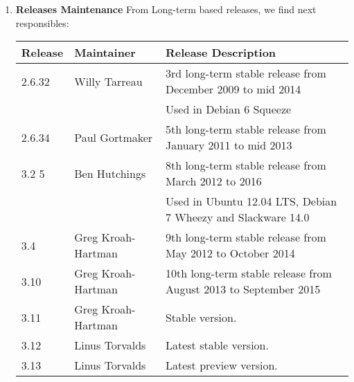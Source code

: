 \documentclass[11pt]{article}
\begin{document}
\begin{enumerate}
\item{\textbf{Releases Maintenance}}
From Long-term based releases, we find next responsibles:\\
\begin{center}
    \hspace*{-2cm}\begin{tabular}{ | l | l | l | }
    \hline
    Release & Maintainer & Release Description\\
    \hline
    \hline
    2.6.32 & Willy Tarreau & 3rd long-term stable release from December 2009 to mid 2014\\
    & & Used in Debian 6 Squeeze\\
    \hline
    2.6.34	& Paul Gortmaker & 5th long-term stable release from January 2011 to mid 2013\\
    \hline
    3.2	5  & Ben Hutchings	& 8th long-term stable release from March 2012 to 2016\\
    & & Used in Ubuntu 12.04 LTS, Debian 7 Wheezy and Slackware 14.0\\
    \hline
    3.4	   & Greg Kroah-Hartman & 9th long-term stable release from May 2012 to October 2014\\
    \hline
    3.10   & Greg Kroah-Hartman & 10th long-term stable release from August 2013 to September 2015\\
    \hline
    3.11   & Greg Kroah-Hartman	& Stable version.\\
    \hline
    3.12   & Linus Torvalds	& Latest stable version.\\
    \hline
    3.13   & Linus Torvalds	& Latest preview version.\\
    \hline
    \end{tabular}
\end{center}
\end{enumerate}
\end{document}

